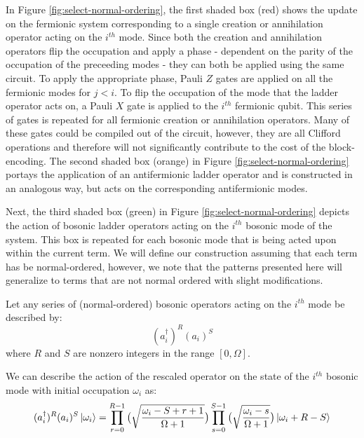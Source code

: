 In Figure \ref{fig:select-normal-ordering}, the first shaded box (red) shows the update on the fermionic system corresponding to a single creation or annihilation operator acting on the $i^{th}$ mode.
Since both the creation and annihilation operators flip the occupation and apply a phase - dependent on the parity of the occupation of the preceeding modes - they can both be applied using the same circuit.
To apply the appropriate phase, Pauli $Z$ gates are applied on all the fermionic modes for $j < i$.
To flip the occupation of the mode that the ladder operator acts on, a Pauli $X$ gate is applied to the $i^{th}$ fermionic qubit.
This series of gates is repeated for all fermionic creation or annihilation operators.
Many of these gates could be compiled out of the circuit, however, they are all Clifford operations and therefore will not significantly contribute to the cost of the block-encoding.
The second shaded box (orange) in Figure \ref{fig:select-normal-ordering} portays the application of an antifermionic ladder operator and is constructed in an analogous way, but acts on the corresponding antifermionic modes.

Next, the third shaded box (green) in Figure \ref{fig:select-normal-ordering} depicts the action of bosonic ladder operators acting on the $i^{th}$ bosonic mode of the system.
This box is repeated for each bosonic mode that is being acted upon within the current term.
We will define our construction assuming that each term has be normal-ordered, however, we note that the patterns presented here will generalize to terms that are not normal ordered with slight modifications.

Let any series of (normal-ordered) bosonic operators acting on the $i^{th}$ mode be described by:
\begin{equation}
    (a_i^\dagger)^R (a_i)^S
\end{equation}
where $R$ and $S$ are nonzero integers in the range $[0, \Omega]$.

We can describe the action of the rescaled operator on the state of the $i^{th}$ bosonic mode with initial occupation $\omega_i$ as:
\begin{equation}
    \label{eq:bosonic-operator-action}
    (a_i^\dagger)^R (a_i)^S \ket{\omega_i} = \prod_{r=0}^{R-1} \big( \sqrt{\frac{\omega_i - S + r + 1}{\Omega + 1}} \big) \prod_{s=0}^{S-1} \big( \sqrt{\frac{\omega_i - s}{\Omega + 1}} \big) \ket{\omega_i + R - S}
\end{equation}

